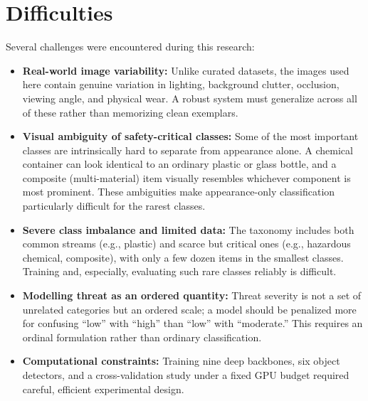 \section{Difficulties}
Several challenges were encountered during this research:
\begin{itemize}
    \item \textbf{Real-world image variability:} Unlike curated datasets, the images used here contain genuine variation in lighting, background clutter, occlusion, viewing angle, and physical wear. A robust system must generalize across all of these rather than memorizing clean exemplars.

    \item \textbf{Visual ambiguity of safety-critical classes:} Some of the most important classes are intrinsically hard to separate from appearance alone. A chemical container can look identical to an ordinary plastic or glass bottle, and a composite (multi-material) item visually resembles whichever component is most prominent. These ambiguities make appearance-only classification particularly difficult for the rarest classes.

    \item \textbf{Severe class imbalance and limited data:} The taxonomy includes both common streams (e.g., plastic) and scarce but critical ones (e.g., hazardous chemical, composite), with only a few dozen items in the smallest classes. Training and, especially, evaluating such rare classes reliably is difficult.

    \item \textbf{Modelling threat as an ordered quantity:} Threat severity is not a set of unrelated categories but an ordered scale; a model should be penalized more for confusing ``low'' with ``high'' than ``low'' with ``moderate.'' This requires an ordinal formulation rather than ordinary classification.

    \item \textbf{Computational constraints:} Training nine deep backbones, six object detectors, and a cross-validation study under a fixed GPU budget required careful, efficient experimental design.
\end{itemize}


